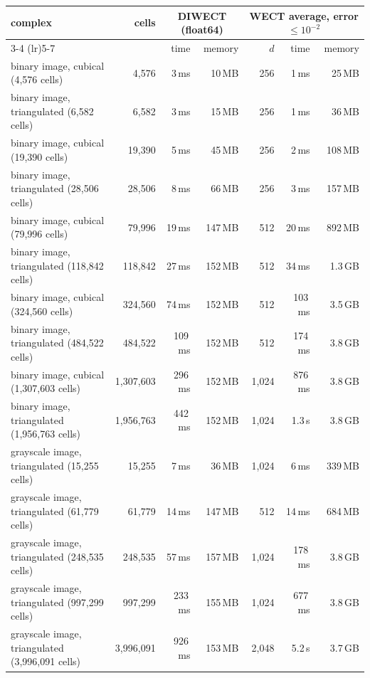 
\begin{tabular}{lrrrrrr}
\toprule
complex & cells & \multicolumn{2}{c}{DIWECT (float64)} & \multicolumn{3}{c}{WECT average, error $\leq 10^{-2}$} \\
\cmidrule(lr){3-4} \cmidrule(lr){5-7}
 & & time & memory & $d$ & time & memory \\
\midrule
binary image, cubical (4,576 cells) & 4,576 & 3\,ms & 10\,MB & 256 & 1\,ms & 25\,MB \\
binary image, triangulated (6,582 cells) & 6,582 & 3\,ms & 15\,MB & 256 & 1\,ms & 36\,MB \\
binary image, cubical (19,390 cells) & 19,390 & 5\,ms & 45\,MB & 256 & 2\,ms & 108\,MB \\
binary image, triangulated (28,506 cells) & 28,506 & 8\,ms & 66\,MB & 256 & 3\,ms & 157\,MB \\
binary image, cubical (79,996 cells) & 79,996 & 19\,ms & 147\,MB & 512 & 20\,ms & 892\,MB \\
binary image, triangulated (118,842 cells) & 118,842 & 27\,ms & 152\,MB & 512 & 34\,ms & 1.3\,GB \\
binary image, cubical (324,560 cells) & 324,560 & 74\,ms & 152\,MB & 512 & 103\,ms & 3.5\,GB \\
binary image, triangulated (484,522 cells) & 484,522 & 109\,ms & 152\,MB & 512 & 174\,ms & 3.8\,GB \\
binary image, cubical (1,307,603 cells) & 1,307,603 & 296\,ms & 152\,MB & 1,024 & 876\,ms & 3.8\,GB \\
binary image, triangulated (1,956,763 cells) & 1,956,763 & 442\,ms & 152\,MB & 1,024 & 1.3\,s & 3.8\,GB \\
grayscale image, triangulated (15,255 cells) & 15,255 & 7\,ms & 36\,MB & 1,024 & 6\,ms & 339\,MB \\
grayscale image, triangulated (61,779 cells) & 61,779 & 14\,ms & 147\,MB & 512 & 14\,ms & 684\,MB \\
grayscale image, triangulated (248,535 cells) & 248,535 & 57\,ms & 157\,MB & 1,024 & 178\,ms & 3.8\,GB \\
grayscale image, triangulated (997,299 cells) & 997,299 & 233\,ms & 155\,MB & 1,024 & 677\,ms & 3.8\,GB \\
grayscale image, triangulated (3,996,091 cells) & 3,996,091 & 926\,ms & 153\,MB & 2,048 & 5.2\,s & 3.7\,GB \\

\end{tabular}
